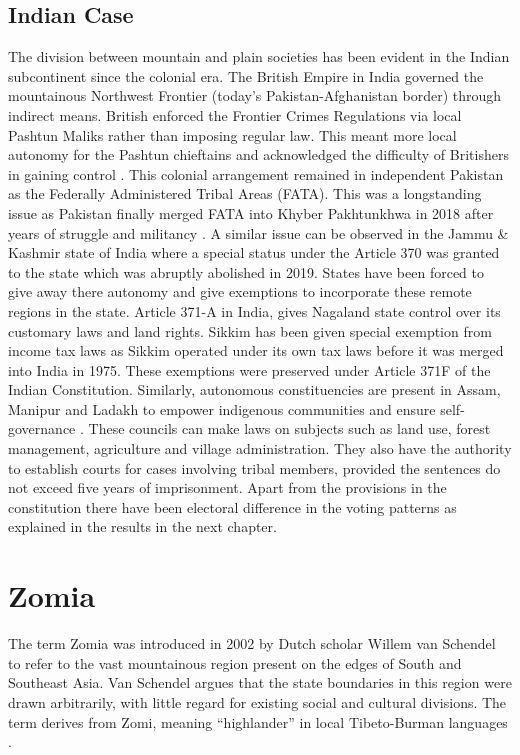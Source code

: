 \begin{sloppypar}
\subsection{Indian Case}
The division between mountain and plain societies has been evident in the Indian subcontinent since the colonial era. The British Empire in India governed the mountainous Northwest Frontier (today’s Pakistan-Afghanistan border) through indirect means. British enforced the Frontier Crimes Regulations via local Pashtun Maliks rather than imposing regular law. This meant more local autonomy for the Pashtun chieftains and acknowledged the difficulty of Britishers in gaining control \citep{ali2013indigenous}. This colonial arrangement remained in independent Pakistan as the Federally Administered Tribal Areas (FATA). This was a longstanding issue as  Pakistan finally merged FATA into Khyber Pakhtunkhwa in 2018 after years of struggle and militancy \citep{horgan2008leaving}. A similar issue can be observed in the Jammu \& Kashmir state of India where a special status under the Article 370 was granted to the state which was abruptly abolished in 2019. States have been forced to give away there autonomy and give exemptions to incorporate these remote regions in the state. Article 371-A in India, gives Nagaland state control over its customary laws and land rights. Sikkim has been given special exemption from income tax laws as Sikkim operated under its own tax laws before it was merged into India in 1975. These exemptions were preserved under Article 371F of the Indian Constitution. Similarly, autonomous constituencies are present in  Assam, Manipur and Ladakh to empower indigenous communities and ensure self-governance \citep{sixthschedule}. These councils can make laws on subjects such as land use, forest management, agriculture and village administration. They also have the authority to establish courts for cases involving tribal members, provided the sentences do not exceed five years of imprisonment. Apart from the provisions in the constitution there have been electoral difference in the voting patterns as explained in the results in the next chapter. 

\section{Zomia}
The term Zomia was introduced in 2002 by Dutch scholar Willem van Schendel to refer to the vast mountainous region present on the edges of South and Southeast Asia. Van Schendel argues that the state boundaries in this region were drawn arbitrarily, with little regard for existing social and cultural divisions. The term derives from Zomi, meaning “highlander” in local Tibeto-Burman languages \citep{van2005geographies}. 


\end{sloppypar}
